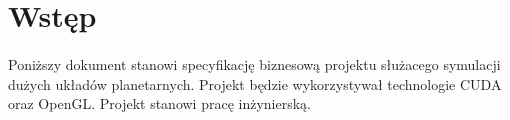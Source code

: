 \section{Wstęp}\label{sec:wstep}
	
\paragraph{}

Poniższy dokument stanowi specyfikację biznesową projektu służacego symulacji dużych układów planetarnych. Projekt będzie wykorzystywał technologie CUDA oraz OpenGL. Projekt stanowi pracę inżynierską.

